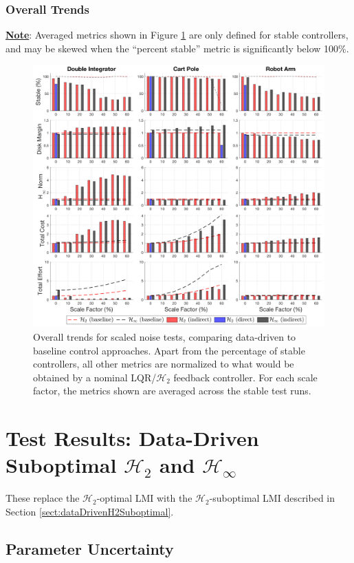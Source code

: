 \subsubsection{Overall Trends}
\underline{\textbf{Note}}: Averaged metrics shown in Figure \ref{fig:overall_trends_noise_opt_bar} are only defined for stable controllers, and may be skewed when the ``percent stable'' metric is significantly below 100\%.
\begin{figure}[H]
\centering
	\includegraphics[width=\textwidth]{figures/overall_trends_noise_opt_bar.png}
\caption{Overall trends for scaled noise tests, comparing data-driven to baseline control approaches.  Apart from the percentage of stable controllers, all other metrics are normalized to what would be obtained by a nominal LQR/$\mathcal{H}_{2}$ feedback controller.  For each scale factor, the metrics shown are averaged across the stable test runs.}
\label{fig:overall_trends_noise_opt_bar}
\end{figure}

\newpage
\section{Test Results: Data-Driven Suboptimal $\mathcal{H}_{2}$ and $\mathcal{H}_{\infty}$}
\label{sect:results:data-driven-suboptimal}
These replace the $\mathcal{H}_{2}$-optimal LMI with the $\mathcal{H}_{2}$-suboptimal LMI described in Section \ref{sect:dataDrivenH2Suboptimal}.
\subsection{Parameter Uncertainty}
